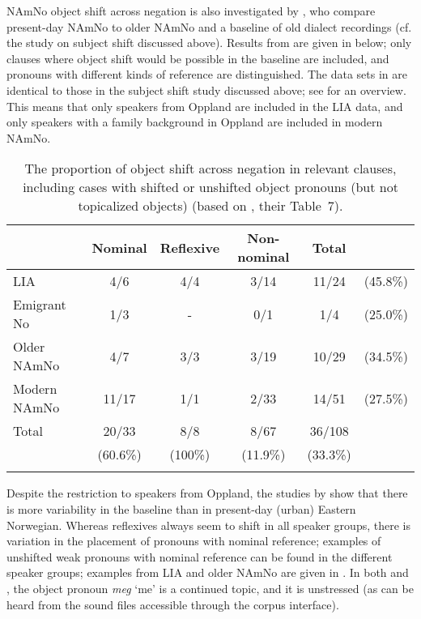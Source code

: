 \documentclass[output=paper]{langscibook}
\begin{document}
NAmNo object shift across negation is also investigated by \citet{LarssonKinn2021, LarssonForthcoming}, who compare present-day NAmNo to older NAmNo and a baseline of old dialect recordings (cf. the study on subject shift discussed above). Results from \citet{LarssonForthcoming} are given in  below; only clauses where object shift would be possible in the baseline are included, and pronouns with different kinds of reference are distinguished. The data sets in  are identical to those in the subject shift study discussed above; see  for an overview. This means that only speakers from Oppland are included in the LIA data, and only speakers with a family background in Oppland are included in modern NAmNo. 

\begin{table}
\caption{The proportion of object shift across negation in relevant clauses, including cases with shifted or unshifted object pronouns (but not topicalized objects) (based on \citealt{LarssonForthcoming}, their Table~7).}
\label{tab:larsson:3}
\begin{tabular}{l ccccc}
\lsptoprule
 & Nominal & Reflexive & Non-nominal & Total \\\midrule
LIA         & 4/6   & 4/4 & 3/14 & 11/24 & (45.8\%)\\
Emigrant No & 1/3   & {}- & 0/1  & 1/4   & (25.0\%) \\
Older NAmNo  & 4/7   & 3/3 & 3/19 & 10/29 & (34.5\%)\\
Modern NAmNo & 11/17 & 1/1 & 2/33 & 14/51 & (27.5\%)\\\addlinespace
Total       & 20/33 & 8/8 & 8/67 & 36/108&  \\
            & (60.6\%) & (100\%) & (11.9\%) & (33.3\%)\\
\lspbottomrule
\end{tabular}
\end{table}

Despite the restriction to speakers from Oppland, the studies by \citet{LarssonForthcoming} show that there is more variability in the baseline than in present-day (urban) Eastern Norwegian. Whereas reflexives always seem to shift in all speaker groups, there is variation in the placement of pronouns with nominal reference; examples of unshifted weak pronouns with nominal reference can be found in the different speaker groups; examples from LIA and older NAmNo are given in . In both  and , the object pronoun \textit{meg} ‘me’ is a continued topic, and it is unstressed (as can be heard from the sound files accessible through the corpus interface). 
\end{document}
